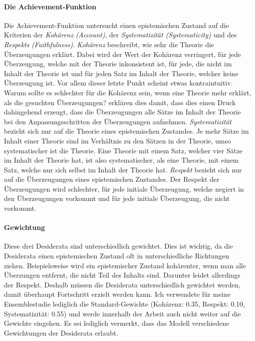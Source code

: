 \documentclass{article}
\begin{document}
\paragraph{Die Achievement-Funktion} \label{achievement-funktion}
Die Achievement-Funktion untersucht einen epistemischen Zustand auf die Kriterien der \textit{Kohärenz (Account)}, der \textit{Systematizität (Systematicity)} und des \textit{Respekts (Faithfulness)}. \textit{Kohärenz} beschreibt, wie sehr die Theorie die Überzeugungen erklärt. Dabei wird der Wert der Kohärenz verringert, für jede Überzeugung, welche mit der Theorie inkonsistent ist, für jede, die nicht im Inhalt der Theorie ist und für jeden Satz im Inhalt der Theorie, welcher keine Überzeugung ist. Vor allem dieser letzte Punkt scheint etwas kontraintuitiv. Warum sollte es schlechter für die Kohärenz sein, wenn eine Theorie mehr erklärt, als die gesuchten Überzeugungen? \citeauthor{beisbart_making_2021} erklären dies damit, dass dies einen Druck dahingehend erzeugt, dass die Überzeugungen alle Sätze im Inhalt der Theorie bei den Anpassungsschritten der Überzeugungen aufnehmen.
\textit{Systematizität} bezieht sich nur auf die Theorie eines epistemischen Zustandes. Je mehr Sätze im Inhalt einer Theorie sind im Verhältnis zu den Sätzen in der Theorie, umso systematischer ist die Theorie. Eine Theorie mit einem Satz, welcher vier Sätze im Inhalt der Theorie hat, ist also systematischer, als eine Theorie, mit einem Satz, welche nur sich selbst im Inhalt der Theorie hat.
\textit{Respekt} bezieht sich nur auf die Überzeugungen eines epistemischen Zustandes. Der Respekt der Überzeugungen wird schlechter, für jede initiale Überzeugung, welche negiert in den Überzeugungen vorkommt und für jede initiale Überzeugung, die nicht vorkommt.

\paragraph{Gewichtung} Diese drei Desiderata sind unterschiedlich gewichtet. Dies ist wichtig, da die Desiderata einen epistemischen Zustand oft in unterschiedliche Richtungen ziehen. Beispielsweise wird ein epistemischer Zustand kohärenter, wenn man alle Überzungen entfernt, die nicht Teil des Inhalts sind. Darunter leidet allerdings der Respekt. Deshalb müssen die Desiderata unterschiedlich gewichtet werden, damit überhaupt Fortschritt erzielt werden kann. Ich verwendete für meine Ensemblestudie lediglich die Standard-Gewichte (Kohärenz: 0.35, Respekt: 0.10, Systematizität: 0.55) und werde innerhalb der Arbeit auch nicht weiter auf die Gewichte eingehen. Es sei lediglich vermerkt, dass das Modell verschiedene Gewichtungen der Desiderata erlaubt. \autocite[S.~9]{beisbart_making_2015}
\end{document}
